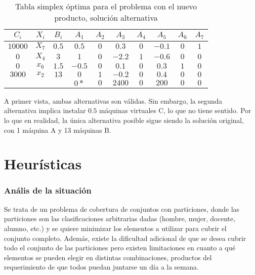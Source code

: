 \documentclass[a4paper,11pt]{article}
\begin{document}
\begin{table}[h!]
\centering
\begin{tabular}{ | c | c | c || c | c | c | c | c | c | c | }
  \hline
  \(C_i\)  & \(X_i\) & \(B_i\) & \(A_1\) & \(A_2\) & \(A_3\)  & \(A_4\) & \(A_5\)  & \(A_6\) & \(A_7\) \\ \hline
 \(10000\) & \(X_7\) & \(0.5\) & \(0.5\) & \(0\)   & \(0.3\)  & \(0\)   & \(-0.1\) & \(0\)   & \(1\) \\ \hline
 \(0\)     & \(X_4\) & \(3\)   & \(1\)   & \(0\)   & \(-2.2\) & \(1\)   & \(-0.6\) & \(0\)   & \(0\) \\ \hline
  \(0\)    & \(x_6\) & \(1.5\) & \(-0.5\)& \(0\)   & \(0.1\)  & \(0\)   & \(0.3\)  & \(1\)   & \(0\) \\ \hline
  \(3000\) & \(x_2\) & \(13\)  & \(0\)   & \(1\)   & \(-0.2\) & \(0\)   & \(0.4\)  & \(0\)   & \(0\) \\ \hline \hline
  \multicolumn{3}{|c|}{ }      & \(0*\)  & \(0\)   & \(2400\) & \(0\)   & \(200\)  & \(0\)   & \(0\) \\ \hline
\end{tabular}
\caption{Tabla simplex óptima para el problema con el nuevo producto, solución alternativa}
\end{table}

\FloatBarrier

A primer vista, ambas alternativas son válidas. Sin embargo, la segunda
alternativa implica instalar \(0.5\) máquinas virtuales C, lo que no tiene
sentido. Por lo que en realidad, la única alternativa posible sigue siendo la
solución original, con 1 máquina A y 13 máquinas B.

\part{Heurísticas}

\section{Anális de la situación}

Se trata de un problema de cobertura de conjuntos con particiones, donde las
particiones son las clasificaciones arbitrarias dadas (hombre, mujer, docente,
alumno, etc.) y se quiere minimizar los elementos a utilizar para cubrir el
conjunto completo. Además, existe la dificultad adicional de que se desea
cubrir todo el conjunto de las particiones pero existen limitaciones en cuanto
a qué elementos se pueden elegir en distintas combinaciones, productos del
requerimiento de que todos puedan juntarse un día a la semana.
\end{document}
